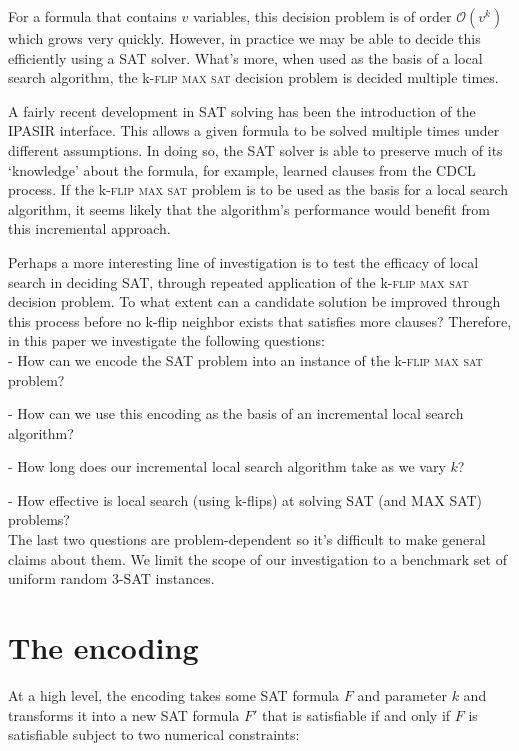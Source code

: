 \documentclass{article}
\begin{document}
\noindent For a formula that contains $v$ variables, this decision problem is
of order $\mathcal{O}(v^k)$ which grows very quickly. However, in practice we
may be able to decide this efficiently using a SAT solver. What's more, when
used as the basis of a local search algorithm, the k-\textsc{flip max sat}
decision problem is decided multiple times.

A fairly recent development in SAT solving has been the introduction of the
IPASIR interface\cite{balyo2016sat}. This allows a given formula to be solved
multiple times under different assumptions. In doing so, the SAT solver is able
to preserve much of its ‘knowledge’ about the formula, for example, learned
clauses from the CDCL process. If the k-\textsc{flip max sat} problem is to be
used as the basis for a local search algorithm, it seems likely that the
algorithm's performance would benefit from this incremental approach.

Perhaps a more interesting line of investigation is to test the efficacy of
local search in deciding SAT, through repeated application of the
k-\textsc{flip max sat} decision problem. To what extent can a candidate
solution be improved through this process before no k-flip neighbor exists that
satisfies more clauses? Therefore, in this paper we investigate the following
questions: \\

- How can we encode the SAT problem into an instance of the k-\textsc{flip max sat} problem?

- How can we use this encoding as the basis of an incremental local search algorithm?

- How long does our incremental local search algorithm take as we vary $k$?

- How effective is local search (using k-flips) at solving SAT (and MAX SAT) problems? \\

\noindent The last two questions are problem-dependent so it's difficult to
make general claims about them. We limit the scope of our investigation to a
benchmark set of uniform random 3-SAT instances.

\break

\section{The encoding}

At a high level, the encoding takes some SAT formula $F$ and parameter $k$ and
transforms it into a new SAT formula $F'$ that is satisfiable if and only if
$F$ is satisfiable subject to two numerical constraints:
\end{document}
